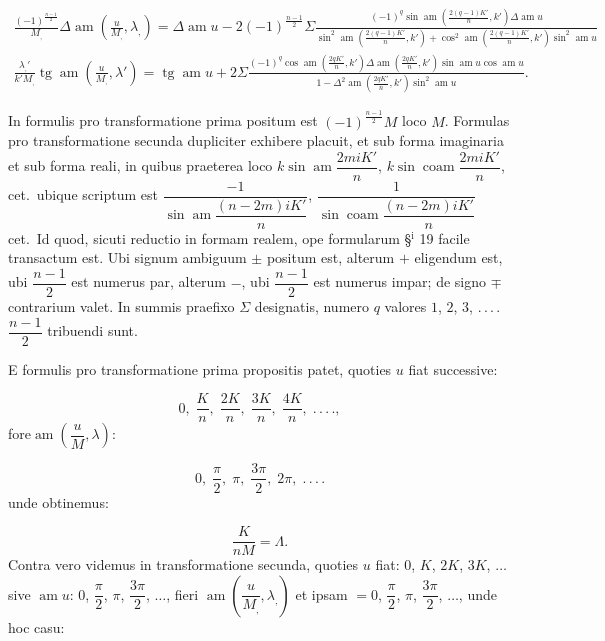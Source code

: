 \documentclass{article}
\begin{document}
\[\begin{gathered}
\frac{(-1)^{\frac{n-1}{2}}}{M_{,}}\Delta\operatorname{am}\left(\frac{u}{M_{,}},\lambda_{,}\right)=\Delta\operatorname{am}u-2(-1)^{\frac{n-1}{2}}\Sigma\frac{(-1)^{q}\sin\operatorname{am}\left(\frac{2(q-1)K'}{n},k'\right)\Delta\operatorname{am}u}{\sin^{2}\operatorname{am}\left(\frac{2(q-1)K'}{n},k'\right)+\cos^{2}\operatorname{am}\left(\frac{2(q-1)K'}{n},k'\right)\sin^{2}\operatorname{am}u}\\[2.5ex]
\frac{\lambda_{,}'}{k'M_{,}}\operatorname{tg}\operatorname{am}\left(\frac{u}{M_{,}},\lambda'\right)=\operatorname{tg}\operatorname{am}u+2\Sigma\frac{(-1)^{q}\cos\operatorname{am}\left(\frac{2qK'}{n},k'\right)\Delta\operatorname{am}\left(\frac{2qK'}{n},k'\right)\sin\operatorname{am}u\cos\operatorname{am}u}{1-\Delta^{2}\operatorname{am}\left(\frac{2qK'}{n},k'\right)\sin^{2}\operatorname{am}u}.
\end{gathered}
\]

In formulis pro transformatione prima positum est $(-1)^{\frac{n-1}{2}}M$ loco $M$. Formulas pro transformatione secunda dupliciter exhibere placuit, et sub forma imaginaria et sub forma reali, in quibus praeterea loco $k\sin\operatorname{am}\dfrac{2miK'}{n}$, $k\sin\operatorname{coam}\dfrac{2miK'}{n}$, cet.\ ubique scriptum est $\dfrac{-1}{\sin\operatorname{am}\dfrac{(n-2m)iK'}{n}}$, $\dfrac{1}{\sin\operatorname{coam}\dfrac{(n-2m)iK'}{n}}$ cet.\ Id quod, sicuti reductio in formam realem, ope formularum §$^{\mathrm{i}}$ 19 facile transactum est. Ubi signum ambiguum $\pm$ positum est, alterum $+$ eligendum est, ubi $\dfrac{n-1}{2}$ est numerus par, alterum $-$, ubi $\dfrac{n-1}{2}$ est numerus impar; de signo $\mp$ contrarium valet. In summis praefixo $\Sigma$ designatis, numero $q$ valores $1$, $2$, $3$, $.\,.\,.\,.$ $\dfrac{n-1}{2}$ tribuendi sunt.

E formulis pro transformatione prima propositis patet, quoties $u$ fiat successive:

\[
0,\;\frac{K}{n},\;\frac{2K}{n},\;\frac{3K}{n},\;\frac{4K}{n},\;.\,.\,.\,.,
\]
fore$\operatorname{am}\left(\dfrac{u}{M},\lambda\right)$:

\[
0,\;\frac{\pi}{2},\;\pi,\;\frac{3\pi}{2},\;2\pi,\;.\,.\,.\,.
\]
unde obtinemus:

\[
\frac{K}{nM}=\Lambda.
\]
Contra vero videmus in transformatione secunda, quoties $u$ fiat: $0$, $K$, $2K$, $3K$, $\ldots$ sive $\operatorname{am}u$: $0$, $\dfrac{\pi}{2}$, $\pi$, $\dfrac{3\pi}{2}$, $\ldots$, fieri $\operatorname{am}\left(\dfrac{u}{M_{,}},\lambda_{,}\right)$ et ipsam $=0$, $\dfrac{\pi}{2}$, $\pi$, $\dfrac{3\pi}{2}$, $\ldots$, unde hoc casu:
\end{document}
